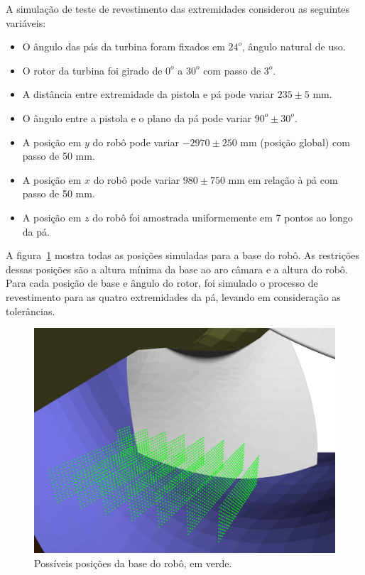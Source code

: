 A simulação de teste de revestimento das extremidades considerou as seguintes
variáveis: 

\begin{itemize}
  \item O ângulo das pás da turbina foram fixados em $24^o$, ângulo natural de
  uso.
  \item O rotor da turbina foi girado de $0^o$ a $30^o$ com passo de $3^o$.
  \item A distância entre extremidade da pistola e pá pode variar $235
  \pm 5$ mm.
  \item O ângulo entre a pistola e o plano da pá pode variar $90^o \pm
  30^o$.
  \item A posição em $y$ do robô pode variar $-2970 \pm 250$ mm (posição
  global) com passo de 50 mm.
  \item A posição em $x$ do robô pode variar $980 \pm 750$ mm em relação à pá
  com passo de 50 mm.
  \item A posição em $z$ do robô foi amostrada uniformemente em 7 pontos ao
  longo da pá.
\end{itemize}

A figura~\ref{fig::trilho2all} mostra todas as posições simuladas para a base do
robô. As restrições dessas posições são a altura mínima da base ao aro câmara e
a altura do robô. Para cada posição de base e ângulo do rotor, foi simulado o
processo de revestimento para as quatro extremidades da pá, levando em
consideração as tolerâncias.

\begin{figure}[!ht]
	\centering	
	\includegraphics[width=1\columnwidth]{figs/trilho2all.png}
	\caption{Possíveis posições da base do robô, em verde.}
	\label{fig::trilho2all}
\end{figure}

